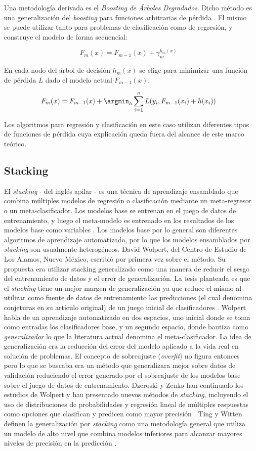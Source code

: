 Una metodología derivada es el \emph{Boosting de Árboles Degradados}. Dicho método es una generalización del \emph{boosting} para funciones arbitrarias de pérdida \cite{smolyakov}. El mismo se puede utilizar tanto para problemas de clasificación como de regresión, y construye el modelo de forma secuencial:

\[ F_m(x) = F_{m-1}(x) + \gamma_m^{h_m(x)} \]

En cada nodo del árbol de decisión \(h_m(x)\) se elige para minimizar una función de pérdida \(L\) dado el modelo actual \(F_{m-1}(x)\):

\[ F_m(x) = F_{m-1}(x) + \argmin_h \sum_{i=1}^n L(y_i, F_{m-1}(x_i) + h(x_i) )\]

Los algoritmos para regresión y clasificación en este caso utilizan diferentes tipos de funciones de pérdida cuya explicación queda fuera del alcance de este marco teórico. 

\subsection{Stacking}
El \emph{stacking} - del inglés apilar - es una técnica de aprendizaje ensamblado que combina múltiples modelos de regresión o clasificación mediante un meta-regresor o un meta-clasificador. Los modelos base se entrenan en el juego de datos de entrenamiento, y luego el meta-modelo es entrenado en los resultados de los modelos base como variables \cite{smolyakov}. Los modelos base por lo general son diferentes algoritmos de aprendizaje automatizado, por lo que los modelos ensamblados por \emph{stacking} son usualmente heterogéneos. David Wolpert, del Centro de Estudio de Los Alamos, Nuevo México, escribió por primera vez sobre el método. Su propuesta era utilizar stacking generalizado como una manera de reducir el sesgo del entrenamiento de datos y el error de generalización. La tesis planteada es que el \emph{stacking} tiene un mejor margen de generalización ya que reduce el mismo al utilizar como fuente de datos de entrenamiento las predicciones (el cual denomina conjeturas en su artículo original) de un juego inicial de clasificadores \cite{wolpert}. Wolpert habla de un aprendizaje automatizado en dos espacios, uno inicial donde se toma como entradas los clasificadores base, y un segundo espacio, donde bautiza como \emph{generalizador} lo que la literatura actual denomina el meta-clasificador. La idea de generalización era la reducción del error del modelo aplicado a la vida real en solución de problemas. El concepto de sobreajuste (\textit{overfit}) no figura entonces pero lo que se buscaba era un método que generalizara mejor sobre datos de validación reduciendo el error generado por el sobreajuste de los modelos base sobre el juego de datos de entrenamiento. Dzeroski y Zenko han continuado los estudios de Wolpert y han presentado nuevos métodos de \emph{stacking}, incluyendo el uso de distribuciones de probabilidades y regresión lineal de múltiples respuestas como opciones que clasifican y predicen como mayor precisión \cite{DzeroskiZenko}. Ting y Witten definen la generalización por \emph{stacking} como una metodología general que utiliza un modelo de alto nivel que combina modelos inferiores para alcanzar mayores niveles de precisión en la predicción \cite{tingwitten}.

